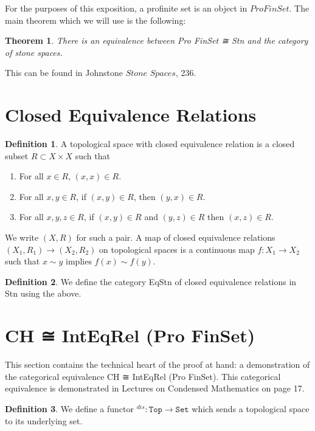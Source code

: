 \documentclass[13pt]{amsart}
\newtheorem{theorem}{Theorem}
\theoremstyle{definition}
\newtheorem{definition}{Definition}
\begin{document}
For the purposes of this exposition, a profinite set is an object in $Pro FinSet$. The main theorem which we will use is the following:

\begin{theorem}
There is an equivalence between Pro FinSet ≅ Stn and the category of stone spaces.
\end{theorem}

This can be found in Johnstone $\textit{Stone Spaces}$, 236.\\


\section{Closed Equivalence Relations}

\begin{definition}
A topological space with closed equivalence relation is a closed subset $R \subset X \times X$ such that
\begin{enumerate}
\item For all $x \in R$, $(x, x) \in R$.
\item For all $x, y \in R$, if $(x, y) \in R$, then $(y, x) \in R$.
\item For all $x, y, z \in R$, if $(x,y) \in R$ and $(y, z) \in R$ then $(x, z) \in R$.
\end{enumerate}
We write $(X,R)$ for such a pair. A map of closed equivalence relations $(X_1,R_1) \rightarrow (X_2,R_2)$ on topological spaces is a continuous map $f : X_1 \rightarrow X_2$ such that $x \sim y$ implies $f(x) \sim f(y)$.
\end{definition}

\begin{definition}
We define the category EqStn of closed equivalence relations in Stn using the above.
\end{definition}

\section{CH ≅ IntEqRel (Pro FinSet)}

This section contains the technical heart of the proof at hand: a demonstration of the categorical equivalence CH ≅ IntEqRel (Pro FinSet). This categorical equivalence is demonstrated in Lectures on Condensed Mathematics on page 17.\\

\begin{definition}
We define a functor ${}^{dis} : \texttt{Top} \rightarrow \texttt{Set}$ which sends a topological space to its underlying set.
\end{definition}
\end{document}
